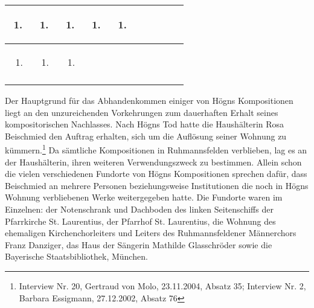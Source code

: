 \documentclass[a4paper]{article}
\begin{document}
\begin{center}
\begin{minipage}{8.096cm}
\begin{flushleft}
\begin{supertabular}{|m{0.60800004cm}|m{0.60800004cm}|m{0.60800004cm}|m{0.60800004cm}|m{0.60800004cm}|m{0.60800004cm}|m{0.60800004cm}|m{0.60800004cm}|m{0.60800004cm}|m{0.626cm}|}
\begin{enumerate}
\item 
\end{enumerate}
 &
\begin{enumerate}
\item 
\end{enumerate}
 &
\begin{enumerate}
\item 
\end{enumerate}
 &
\begin{enumerate}
\item 
\end{enumerate}
 &
\begin{enumerate}
\item 
\end{enumerate}
\\\hline
\begin{enumerate}
\item 
\end{enumerate}
 &
\begin{enumerate}
\item 
\end{enumerate}
 &
\begin{enumerate}
\item 
\end{enumerate}
 &
\\\hhline{---~~~~~~~}
\end{supertabular}
\end{flushleft}
\end{minipage}
\end{center}
Der Hauptgrund für das Abhandenkommen einiger von Högns Kompositionen
liegt an den unzureichenden Vorkehrungen zum dauerhaften Erhalt seines
kompositorischen Nachlasses. Nach Högns Tod hatte die Haushälterin Rosa
Beischmied den Auftrag erhalten, sich um die Auflösung seiner Wohnung
zu kümmern.\footnote{ Interview Nr. 20, Gertraud von Molo, 23.11.2004,
Absatz 35; Interview Nr. 2, Barbara Essigmann, 27.12.2002, Absatz 76}
Da sämtliche Kompositionen in Ruhmannsfelden verblieben, lag es an der
Haushälterin, ihren weiteren Verwendungszweck zu bestimmen. Allein
schon die vielen verschiedenen Fundorte von Högns Kompositionen
sprechen dafür, dass Beischmied an mehrere Personen beziehungsweise
Institutionen die noch in Högns Wohnung verbliebenen Werke
weitergegeben hatte. Die Fundorte waren im Einzelnen: der Notenschrank
und Dachboden des linken Seitenschiffs der Pfarrkirche St. Laurentius,
der Pfarrhof St. Laurentius, die Wohnung des ehemaligen
Kirchenchorleiters und Leiters des Ruhmannsfeldener Männerchors Franz
Danziger, das Haus der Sängerin Mathilde Glasschröder sowie die
Bayerische Staatsbibliothek, München.
\end{document}
